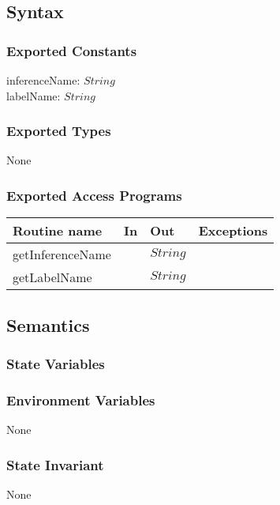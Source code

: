 \documentclass[12pt, titlepage]{article}
\begin{document}
\subsection* {Syntax}

\subsubsection* {Exported Constants}

inferenceName: $String$ \\
labelName: $String$

\subsubsection* {Exported Types}

None

\subsubsection* {Exported Access Programs}

\begin{tabular}{| l | l | l | l |}
\hline
\textbf{Routine name} & \textbf{In} & \textbf{Out} & \textbf{Exceptions}\\
\hline
getInferenceName & & $String$ & \\
\hline
getLabelName & & $String$ & \\
\hline
\end{tabular}

\subsection* {Semantics}

\subsubsection* {State Variables}


\subsubsection* {Environment Variables}

None

\subsubsection* {State Invariant}

None
\end{document}
